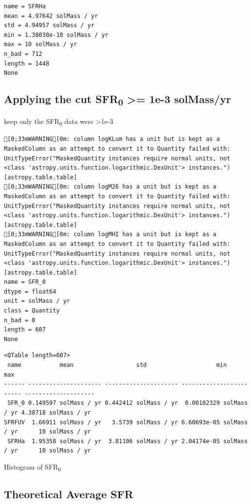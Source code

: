 \documentclass[a4paper]{article}
\begin{document}
\begin{verbatim}
name = SFRHa
mean = 4.97642 solMass / yr
std = 4.94957 solMass / yr
min = 1.38038e-10 solMass / yr
max = 10 solMass / yr
n_bad = 712
length = 1448
None
\end{verbatim}

\subsection{Applying the cut SFR\textsubscript{0} >= 1e-3 solMass/yr}
\label{sec:org8549e88}

keep only the SFR\textsubscript{0} data were >1e-3

\begin{verbatim}
[0;33mWARNING[0m: column logKLum has a unit but is kept as a MaskedColumn as an attempt to convert it to Quantity failed with:
UnitTypeError("MaskedQuantity instances require normal units, not <class 'astropy.units.function.logarithmic.DexUnit'> instances.") [astropy.table.table]
[0;33mWARNING[0m: column logM26 has a unit but is kept as a MaskedColumn as an attempt to convert it to Quantity failed with:
UnitTypeError("MaskedQuantity instances require normal units, not <class 'astropy.units.function.logarithmic.DexUnit'> instances.") [astropy.table.table]
[0;33mWARNING[0m: column logMHI has a unit but is kept as a MaskedColumn as an attempt to convert it to Quantity failed with:
UnitTypeError("MaskedQuantity instances require normal units, not <class 'astropy.units.function.logarithmic.DexUnit'> instances.") [astropy.table.table]
name = SFR_0
dtype = float64
unit = solMass / yr
class = Quantity
n_bad = 0
length = 607
None
\end{verbatim}

\begin{verbatim}
<QTable length=607>
 name           mean                  std                    min                    max         
------ --------------------- --------------------- ------------------------ --------------------
 SFR_0 0.149597 solMass / yr 0.442412 solMass / yr  0.00102329 solMass / yr 4.38718 solMass / yr
SFRFUV  1.66911 solMass / yr   3.5739 solMass / yr 6.60693e-05 solMass / yr      10 solMass / yr
 SFRHa  1.95358 solMass / yr  3.81106 solMass / yr 2.04174e-05 solMass / yr      10 solMass / yr
\end{verbatim}


Histogram of SFR\textsubscript{0}

\subsection{Theoretical Average SFR}
\label{sec:org283c16a}
\end{document}
